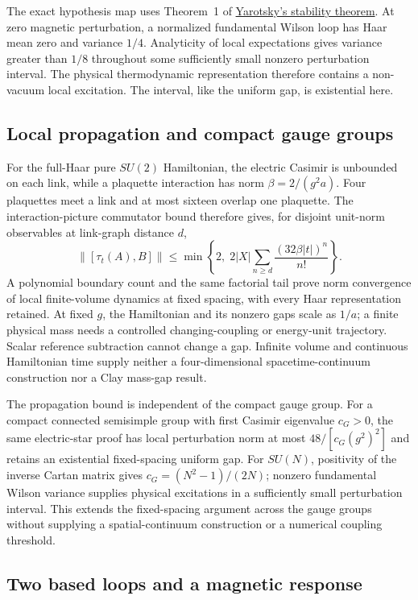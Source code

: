 \documentclass[11pt]{article}
\numberwithin{equation}{section}
\theoremstyle{remark}
\begin{document}
The exact hypothesis map uses Theorem~1 of
\href{https://arxiv.org/abs/math-ph/0412040}{Yarotsky's stability theorem}.
At zero magnetic perturbation, a normalized fundamental Wilson loop has
Haar mean zero and variance $1/4$. Analyticity of local expectations gives
variance greater than $1/8$ throughout some sufficiently small nonzero
perturbation interval. The physical thermodynamic representation therefore
contains a non-vacuum local excitation. The interval, like the uniform gap,
is existential here.

\subsection{Local propagation and compact gauge groups}
For the full-Haar pure $SU(2)$ Hamiltonian, the electric Casimir is unbounded
on each link, while a plaquette interaction has norm $\beta=2/(g^2a)$.
Four plaquettes meet a link and at most sixteen overlap one plaquette.
The interaction-picture commutator bound therefore gives, for disjoint
unit-norm observables at link-graph distance $d$,
\[
 \|[\tau_t(A),B]\|\leq
 \min\left\{2,\;2|X|\sum_{n\geq d}
                  \frac{(32\beta|t|)^n}{n!}\right\}.
\]
A polynomial boundary count and the same factorial tail prove norm
convergence of local finite-volume dynamics at fixed spacing, with every
Haar representation retained. At fixed $g$, the
Hamiltonian and its nonzero gaps scale as $1/a$; a finite physical mass needs
a controlled changing-coupling or energy-unit trajectory. Scalar reference
subtraction cannot change a gap. Infinite volume and continuous Hamiltonian
time supply neither a four-dimensional spacetime-continuum construction nor
a Clay mass-gap result.

The propagation bound is independent of the compact gauge group. For a
compact connected semisimple group with first Casimir eigenvalue $c_G>0$,
the same electric-star proof has local perturbation norm at most
$48/[c_G(g^2)^2]$ and retains an existential fixed-spacing uniform gap.
For $SU(N)$, positivity of the inverse Cartan matrix gives
$c_G=(N^2-1)/(2N)$; nonzero fundamental Wilson variance supplies physical
excitations in a sufficiently small perturbation interval. This extends the
fixed-spacing argument across the gauge groups without supplying a
spatial-continuum construction or a numerical coupling threshold.

\subsection{Two based loops and a magnetic response}
\end{document}
